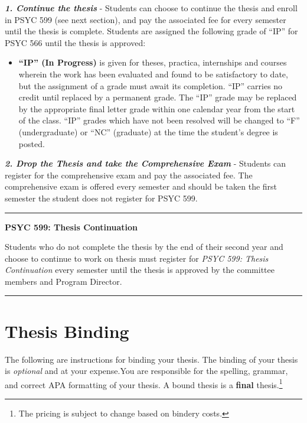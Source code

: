 \documentclass[openany]{book}
\providecommand{\tightlist}{%
  \setlength{\itemsep}{0pt}\setlength{\parskip}{0pt}}
\begin{document}
\textbf{\emph{1. Continue the thesis}} - Students can choose to continue the thesis and enroll in PSYC 599 (see next section), and pay the associated fee for every semester until the thesis is complete. Students are assigned the following grade of ``IP'' for PSYC 566 until the thesis is approved:

\begin{itemize}
\tightlist
\item
  \textbf{``IP'' (In Progress)} is given for theses, practica, internships and courses wherein the work has been evaluated and found to be satisfactory to date, but the assignment of a grade must await its completion. ``IP'' carries no credit until replaced by a permanent grade. The ``IP'' grade may be replaced by the appropriate final letter grade within one calendar year from the start of the class. ``IP'' grades which have not been resolved will be changed to ``F'' (undergraduate) or ``NC'' (graduate) at the time the student's degree is posted.
\end{itemize}

\textbf{\emph{2. Drop the Thesis and take the Comprehensive Exam}} - Students can register for the comprehensive exam and pay the associated fee. The comprehensive exam is offered every semester and should be taken the first semester the student does not register for PSYC 599.

\begin{center}\rule{0.5\linewidth}{0.5pt}\end{center}

\textbf{PSYC 599: Thesis Continuation}

Students who do not complete the thesis by the end of their second year and choose to continue to work on thesis must register for \emph{PSYC 599: Thesis Continuation} every semester until the thesis is approved by the committee members and Program Director.

\begin{center}\rule{0.5\linewidth}{0.5pt}\end{center}

\hypertarget{binding}{%
\chapter{Thesis Binding}\label{binding}}

The following are instructions for binding your thesis. The binding of your thesis is \emph{optional} and at your expense.You are responsible for the spelling, grammar, and correct APA formatting of your thesis. A bound thesis is a \textbf{final} thesis.\footnote{The pricing is subject to change based on bindery costs.}
\end{document}
